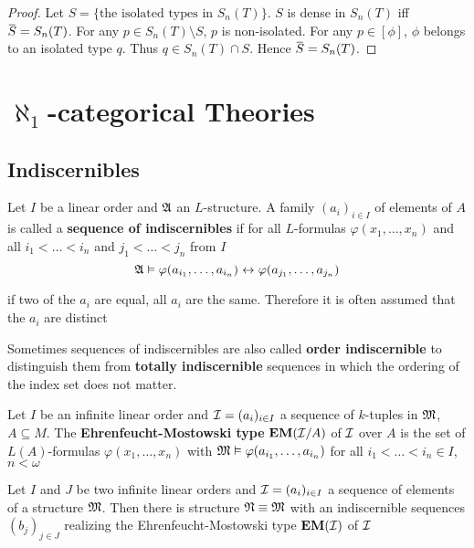 \documentclass[11pt]{article}
\def \EM {\textbf{EM}}
\begin{document}
\begin{proof}
Let \(S=\{\text{the isolated types in }S_n(T)\}\). \(S\) is dense in \(S_n(T)\)
iff \(\barS=S_n(T)\). For any \(p\in S_n(T)\setminus S\), \(p\) is non-isolated. For any \(p\in[\phi]\), \(\phi\)
belongs to an isolated type \(q\). Thus \(q\in S_n(T)\cap S\). Hence \(\barS=S_n(T)\).
\end{proof}



\section{\texorpdfstring{\(\aleph_1\)}{ℵ₁}-categorical Theories}
\label{sec:org52d8f7e}

\subsection{Indiscernibles}
\label{sec:org4efdb48}
\begin{definition}[]
Let \(I\) be a linear order and \(\mathfrak{A}\) an \(L\)-structure. A family \((a_i)_{i\in I}\) of elements
of \(A\) is called a \textbf{sequence of indiscernibles}  if for all \(L\)-formulas \(\varphi(x_1,\dots,x_n)\) and
all \(i_1<\dots<i_n\) and \(j_1<\dots<j_n\) from \(I\)
\begin{equation*}
\mathfrak{A}\vDash\varphi(a_{i_1},\dots,a_{i_n})\leftrightarrow\varphi(a_{j_1},\dots,a_{j_n})
\end{equation*}
\end{definition}

if two of the \(a_i\) are equal, all \(a_i\) are the same. Therefore it is often assumed that
the \(a_i\) are distinct

Sometimes sequences of indiscernibles are also called \textbf{order indiscernible} to distinguish them
from \textbf{totally indiscernible} sequences in which the ordering of the index set does not matter.

\begin{definition}[]
Let \(I\) be an infinite linear order and \(\mathcal{I}=(a_i)_{i\in I}\) a sequence of \(k\)-tuples
in \(\mathfrak{M}\), \(A\subseteq M\). The \textbf{Ehrenfeucht-Mostowski type} \(\EM(\cali/A)\) of \(\mathcal{I}\) over \(A\) is the set
of \(L(A)\)-formulas \(\varphi(x_1,\dots,x_n)\) with \(\mathfrak{M}\vDash\varphi(a_{i_1},\dots,a_{i_n})\) for all \(i_1<\dots<i_n\in I\), \(n<\omega\)
\end{definition}

\begin{lemma}
\label{lemma5.1.3}
Let \(I\) and \(J\) be two infinite linear orders and \(\mathcal{I}=(a_i)_{i\in I}\) a sequence of elements
of a structure \(\mathfrak{M}\). Then there is structure \(\mathfrak{N}\equiv\mathfrak{M}\) with an indiscernible
sequences \((b_j)_{j\in J}\) realizing the Ehrenfeucht-Mostowski type \(\EM(\cali)\) of \(\mathcal{I}\)
\end{lemma}
\end{document}
